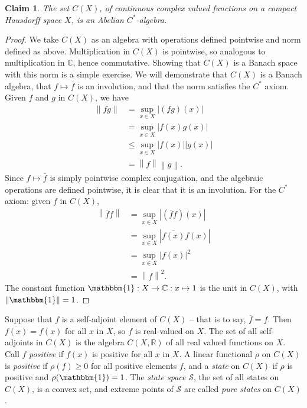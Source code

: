 \documentclass[11pt,a4paper]{report}
\theoremstyle{plain}
\newtheorem*{claim}{Claim}
\theoremstyle{definition}
\newcommand{\1}{\mathbbm{1}}
\newcommand{\C}{\mathbb{C}}
\newcommand{\R}{\mathbb{R}}
\newcommand{\CX}{C(X)}
\renewcommand{\S}{\mathscr{S}}
\renewcommand{\bar}{\overline}
\begin{document}
\begin{claim}
	The set $\CX$, of continuous complex valued functions on a compact Hausdorff space $X$, is an 
	Abelian $C^\ast$-algebra.
\end{claim}
\begin{proof}
	We take $\CX$ as an algebra with operations defined pointwise and norm defined as above.
	Multiplication in $\CX$ is pointwise, so analogous to multiplication in $\C$, hence commutative.
	Showing that $\CX$ is a Banach space with this norm is a simple exercise. We will demonstrate that $
	\CX$ is a Banach algebra, that $f\mapsto\overline{f}$ is an involution, and that the norm satisfies 
	the $C^\ast$ axiom.
	Given $f$ and $g$ in $\CX$, we have 
	\begin{align*}
				\left\|fg\right\| 
		&= 		\sup_{x\in X}|(fg)(x)|											\\
		&= 		\sup_{x\in X}|f(x)g(x)|											\\
		&\leq	\sup_{x\in X}|f(x)||g(x)|										\\
		&=		\left\|f\right\|\left\|g\right\|.
	\end{align*}
	Since $f\mapsto\overline{f}$ is simply pointwise complex conjugation, and the algebraic operations are defined pointwise, it is clear that it is an involution. For the $C^\ast$ axiom: given $f$ in $\CX$,
	\begin{align*}
				\left\|\bar f f\right\| 
		&= 		\sup_{x\in X}|(\bar f f)(x)|									\\
		&= 		\sup_{x\in X}|\bar{f(x)} f(x)|									\\
		&=		\sup_{x\in X}|f(x)|^2											\\
		&=		\left\|f\right\|^2.
	\end{align*}
	The constant function $\1:X\to\C:x\mapsto 1$ is the unit in $\CX$, with $\left\|\1\right\| = 1$.
\end{proof}

Suppose that $f$ is a self-adjoint element of $\CX$ -- that is to say, $\bar f = f$. Then $\bar{f(x)} = 
f(x)$ for all $x$ in $X$, so $f$ is real-valued on $X$. The set of all self-adjoints in $\CX$ is the 
algebra $C(X,\R)$ of all real valued functions on $X$. Call $f$ \emph{positive} if $f(x)$ is positive 
for all $x$ in $X$. 
A linear functional $\rho$ on $\CX$ is \emph{positive} if $\rho(f)\geq 0$ for all positive elements $f$, 
and a \emph{state} on $\CX$ if $\rho$ is positive and $\rho(\1)=1$. The \emph{state space} $\S$, the set 
of all states on $\CX$, is a convex set, and extreme points of $\S$ are called \emph{pure states} on 
$\CX$.
\end{document}

